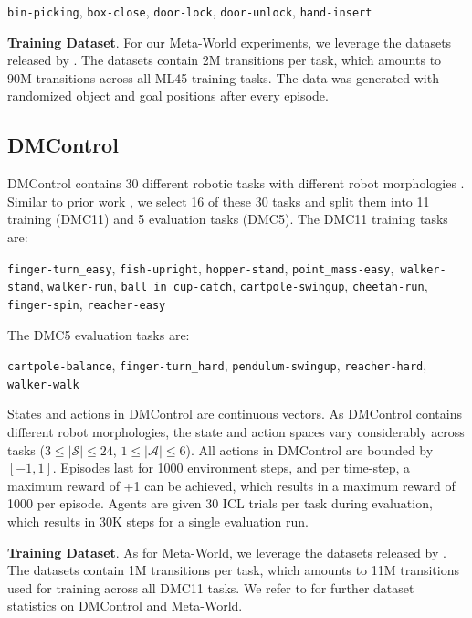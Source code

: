 \hspace{2.5cm}\texttt{bin-picking}, \texttt{box-close}, \texttt{door-lock}, \texttt{door-unlock}, \texttt{hand-insert}

\textbf{Training Dataset}.
For our Meta-World experiments, we leverage the datasets released by \citet{Schmied:23}. 
The datasets contain 2M transitions per task, which amounts to 90M transitions across all ML45 training tasks.
The data was generated with randomized object and goal positions after every episode. 

\subsection{DMControl}\label{appendix:env-data-dmcontrol}
DMControl contains 30 different robotic tasks with different robot morphologies \citep{Tassa:18}.
Similar to prior work \citep{Hafner:19,Schmied:23}, we select 16 of these 30 tasks and split them into 11 training (DMC11) and 5 evaluation tasks (DMC5).
The DMC11 training tasks are: 

\texttt{finger-turn\_easy}, \texttt{fish-upright}, \texttt{hopper-stand},
\texttt{point\_mass-easy},\texttt{ walker-stand}, \texttt{walker-run}, \texttt{ball\_in\_cup-catch},
\texttt{cartpole-swingup}, \texttt{cheetah-run}, \texttt{finger-spin}, \texttt{reacher-easy}

The DMC5 evaluation tasks are:

\texttt{cartpole-balance}, \texttt{finger-turn\_hard}, \texttt{pendulum-swingup}, \texttt{reacher-hard}, \texttt{walker-walk}

States and actions in DMControl are continuous vectors.
As DMControl contains different robot morphologies, the state and action spaces vary considerably across tasks ($3\leq|\mathcal{S}|\leq 24$, $1\leq|\mathcal{A}|\leq6$). 
All actions in DMControl are bounded by $[-1,1]$.
Episodes last for 1000 environment steps, and per time-step, a maximum reward of +1 can be achieved, which results in a maximum reward of 1000 per episode. 
Agents are given 30 ICL trials per task during evaluation, which results in 30K steps for a single evaluation run.  

\textbf{Training Dataset}.
As for Meta-World, we leverage the datasets released by \citet{Schmied:23}.
The datasets contain 1M transitions per task, which amounts to 11M transitions used for training across all DMC11 tasks. We refer to \citet{Schmied:23} for further dataset statistics on DMControl and Meta-World.

